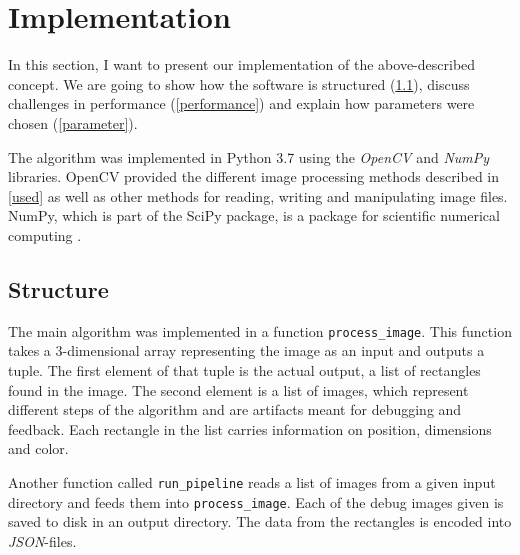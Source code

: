 \section{Implementation}

In this section, I want to present our implementation of the above-described
concept. We are going to show how the software is structured
(\ref{structure}), discuss challenges in performance (\ref{performance}) and
explain how parameters were chosen (\ref{parameter}).

The algorithm was implemented in Python 3.7 using the \textit{OpenCV} and
\textit{NumPy} libraries. OpenCV provided the different image processing methods
described in \ref{used} as well as other methods for reading, writing and
manipulating image files. NumPy, which is part of the SciPy package, is a
package for scientific numerical computing \cite{scipy}.


\subsection{Structure} \label{structure}

The main algorithm was implemented in a function \texttt{process\_image}. This
function takes a 3-dimensional array representing the image as an input and
outputs a tuple. The first element of that tuple is the actual output, a list of
rectangles found in the image. The second element is a list of images, which
represent different steps of the algorithm and are artifacts meant for debugging
and feedback. Each rectangle in the list carries information on position, dimensions
and color.


Another function called \texttt{run\_pipeline} reads a list of images from a
given input directory and feeds them into \texttt{process\_image}. Each of the
debug images given is saved to disk in an output directory. The data from the
rectangles is encoded into \textit{JSON}-files.


